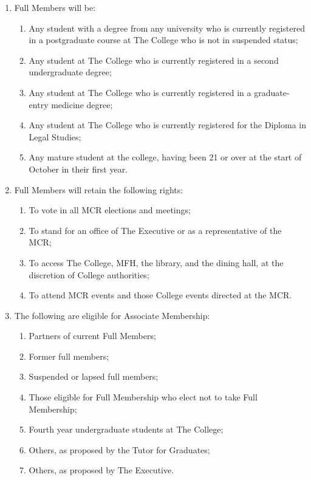 \documentclass[11pt, a4paper]{article}
\begin{document}
\begin{enumerate}
	\item Full Members will be:
        \begin{enumerate}
      		\item Any student with a degree from any university who is currently registered in a postgraduate course at The College who is not in suspended status;
      		\item Any student at The College who is currently registered in a second undergraduate degree;
      		\item Any student at The College who is currently registered in a graduate-entry medicine degree;
      		\item Any student at The College who is currently registered for the Diploma in Legal Studies;
      		\item Any mature student at the college, having been 21 or over at the start of October in their first year.
		\end{enumerate}
    \item Full Members will retain the following rights:
    	\begin{enumerate}
            \item To vote in all MCR elections and meetings;
            \item To stand for an office of The Executive or as a representative of the MCR;
            \item To access The College, MFH, the library, and the dining hall, at the discretion of College authorities;
            \item To attend MCR events and those College events directed at the MCR.
		\end{enumerate}
	\item The following are eligible for Associate Membership:
		\begin{enumerate}
                \item Partners of current Full Members;
                \item Former full members;
                \item Suspended or lapsed full members;
                \item Those eligible for Full Membership who elect not to take Full Membership;
                \item Fourth year undergraduate students at The College;
                \item Others, as proposed by the Tutor for Graduates;
                \item Others, as proposed by The Executive.

\end{enumerate}
\end{enumerate}
\end{document}

